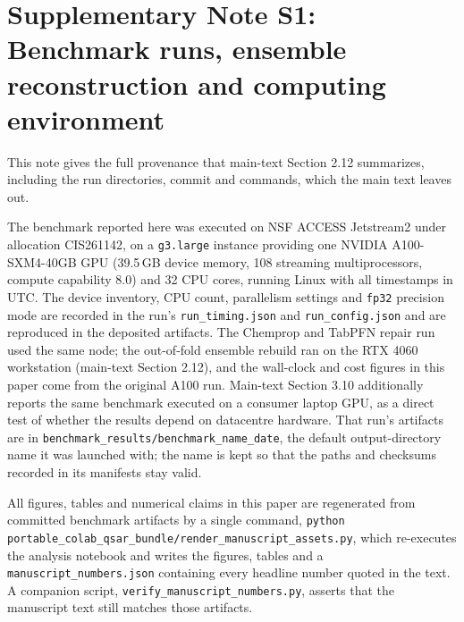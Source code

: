 \documentclass[11pt,a4paper]{article}
\begin{document}
\clearpage


\clearpage


\clearpage
\section*{Supplementary Note S1: Benchmark runs, ensemble reconstruction and computing environment}\label{note:provenance}

This note gives the full provenance that main-text Section 2.12 summarizes, including the run directories,
commit and commands, which the main text leaves out.

The benchmark reported here was executed on NSF ACCESS Jetstream2 \cite{hancock2021jetstream2,boerner2023access} under allocation CIS261142, on a \texttt{g3.large} instance providing one NVIDIA A100-SXM4-40GB GPU (39.5\,GB device memory, 108 streaming multiprocessors, compute capability 8.0) and 32 CPU cores, running Linux with all timestamps in UTC. The device inventory, CPU count, parallelism settings and \texttt{fp32} precision mode are recorded in the run's \texttt{run\_timing.json} and \texttt{run\_config.json} and are reproduced in the deposited artifacts. The Chemprop and TabPFN repair run used the same node; the out-of-fold ensemble rebuild ran on the RTX 4060 workstation (main-text Section 2.12), and the wall-clock and cost figures in this paper come from the original A100 run. Main-text Section 3.10 additionally reports the same benchmark executed on a consumer laptop GPU, as a direct test of whether the results depend on datacentre hardware. That run's artifacts are in \texttt{benchmark\_results/benchmark\_name\_date}, the default output-directory name it was launched with; the name is kept so that the paths and checksums recorded in its manifests stay valid.

All figures, tables and numerical claims in this paper are regenerated from committed benchmark artifacts by a single command, \texttt{python portable\_colab\_qsar\_bundle/render\_manuscript\_assets.py}, which re-executes the analysis notebook and writes the figures, tables and a \texttt{manuscript\_numbers.json} containing every headline number quoted in the text. A companion script, \texttt{verify\_manuscript\_numbers.py}, asserts that the manuscript text still matches those artifacts.
\end{document}
